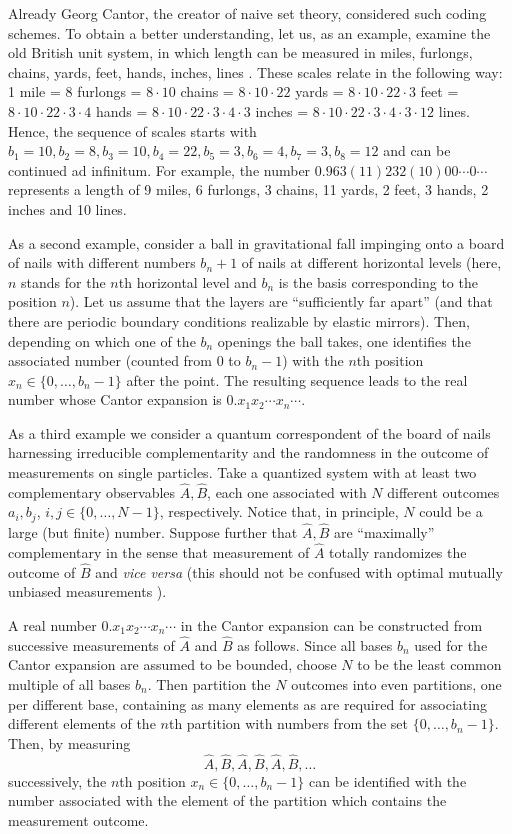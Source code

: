 \documentclass[12pt]{iopart}
\begin{document}
Already Georg Cantor, the creator of naive set theory, considered
such coding schemes.
To obtain a better understanding, let us, as an example,
examine  the old British unit system, in which
length can be measured in miles, furlongs, chains, yards, feet, hands,
inches, lines \cite{drobot}. These scales relate in the following way:  1 mile = 8
furlongs = $8 \cdot 10$ chains =
$8 \cdot 10 \cdot 22$ yards =  $8 \cdot 10 \cdot 22 \cdot 3$ feet = $8 \cdot
10 \cdot 22 \cdot 3
\cdot 4$ hands = $8 \cdot 10 \cdot 22 \cdot 3
\cdot 4 \cdot 3$ inches  =  $8 \cdot 10 \cdot 22 \cdot 3
\cdot 4 \cdot 3 \cdot 12$ lines. Hence,  the sequence of  scales starts with
$b_1 = 10, b_2 = 8, b_3 = 10, b_4 = 22,  b_5 = 3, b_6 = 4, b_7 =3, b_8 = 12$
and can be continued ad infinitum.  For example,  the number $0.963
(11)232(10)00\cdots 0 \cdots$
represents a length of 9 miles, 6 furlongs, 3 chains, 11 yards, 2 feet, 3
hands,  2 inches and 10 lines.


As a second example,  consider a ball in gravitational fall
impinging onto a  board of nails with different numbers
$ b_n+1$ of nails
at different horizontal levels
(here, $n$ stands for the $n$th horizontal level
and $b_n$ is the basis corresponding to the position $n$).
Let us assume that the layers are ``sufficiently far apart''
(and that there are periodic boundary conditions realizable by
elastic mirrors).
Then, depending on which one of the $b_n$ openings the ball takes,
one identifies the associated number
(counted from $0$ to $b_n-1$) with
the $n$th position  $x_n \in \{0,\ldots ,b_n-1\}$ after the point.
The resulting sequence leads to the real number  whose Cantor expansion
is $0.x_1x_2\cdots x_n \cdots $.




As a third example we consider a quantum correspondent of  the  board of
nails
harnessing irreducible complementarity and the randomness  in the outcome of
measurements on single  particles.
Take a quantized system with at least two  complementary
observables
$\hat{A},\hat{B}$,
each one associated with $N$ different outcomes $a_i,b_j$, $i,j \in
\{0,\ldots ,N-1\}$, respectively.
Notice that, in principle, $N$ could be a large (but finite) number.
Suppose further that $\hat{A},\hat{B}$ are ``maximally''  complementary
in the sense that measurement of $\hat{A}$ totally randomizes the outcome
of $\hat{B}$ and {\it vice versa}
(this should not be confused with optimal mutually unbiased measurements
\cite{WooFie}).

A real number $0.x_1x_2\cdots x_n \cdots $ in the Cantor expansion
can be constructed from successive  measurements of $\hat{A}$
and $\hat{B}$ as follows.
Since all bases $b_n$ used for the Cantor
expansion are assumed to be bounded, choose $N$ to be
the least common multiple of all bases $b_n$.
Then partition the $N$ outcomes into even partitions,
one per different base,
containing as many elements as are required for
associating different elements of the $n$th partition
with  numbers from the set  $\{0,\ldots ,b_n-1\}$.
Then, by measuring
$$\hat{A},\hat{B},\hat{A},\hat{B},\hat{A},\hat{B},\ldots$$
successively, the $n$th position  $x_n \in \{0,\ldots ,b_n-1\}$
can be identified
with the number associated with the element of the partition which
contains the measurement outcome.
\end{document}
